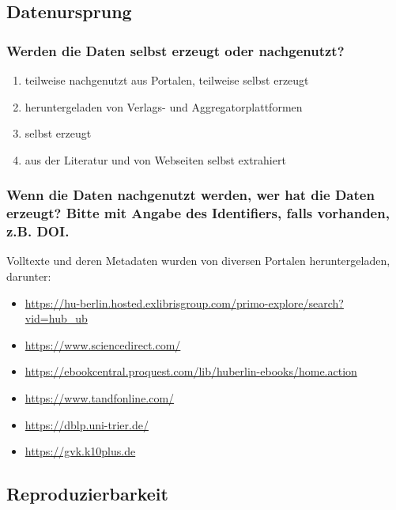 \subsection{Datenursprung}

\subsubsection{Werden die Daten selbst erzeugt oder nachgenutzt?}

\begin{enumerate}[(1)]
  \item
    teilweise nachgenutzt aus Portalen, teilweise selbst erzeugt
  \item
    heruntergeladen von Verlags- und Aggregatorplattformen
  \item
    selbst erzeugt
  \item
    aus der Literatur und von Webseiten selbst extrahiert
\end{enumerate}

\subsubsection{Wenn die Daten nachgenutzt werden, wer hat die Daten erzeugt? Bitte mit Angabe des Identifiers, falls vorhanden, z.B. DOI.}

Volltexte und deren Metadaten wurden von diversen Portalen heruntergeladen, darunter:
%
\begin{itemize}
  \item
    \url{https://hu-berlin.hosted.exlibrisgroup.com/primo-explore/search?vid=hub_ub}
  \item
    \url{https://www.sciencedirect.com/}
  \item
    \url{https://ebookcentral.proquest.com/lib/huberlin-ebooks/home.action}
  \item
    \url{https://www.tandfonline.com/}
  \item
    \url{https://dblp.uni-trier.de/}
  \item
    \url{https://gvk.k10plus.de}
\end{itemize}

\subsection{Reproduzierbarkeit}

